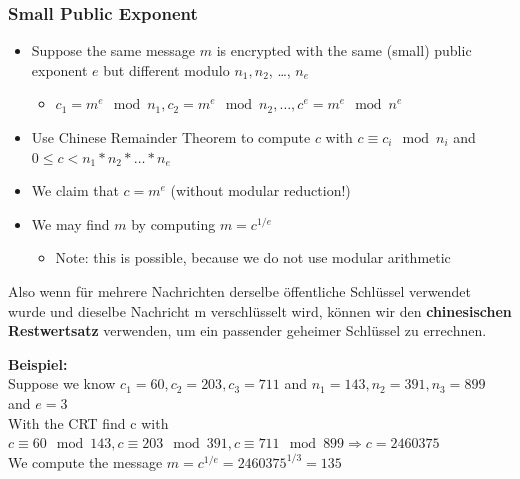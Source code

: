 \hypertarget{small-public-exponent}{%
\subsubsection{Small Public Exponent}\label{small-public-exponent}}

\begin{itemize}
\tightlist
\item
  Suppose the same message $m$ is encrypted with the same (small) public exponent $e$ but different modulo $n_1, n_2$, \ldots{}, $n_e$
  \begin{itemize}
  \tightlist
  \item
    $c_1 = m^e \mod n_1, c_2 = m^e \mod n_2, \ldots{}, c^e = m^e \mod n^e$
  \end{itemize}
\item
  Use Chinese Remainder Theorem to compute $c$ with $c \equiv c_i \mod n_i$ and $0 \leqslant c < n_1 * n_2 * \ldots{} *n_e$
\item
  We claim that $c = m^e$ (without modular reduction!)
\item
  We may find $m$ by computing $m = c^{1/e}$

  \begin{itemize}
  \tightlist
  \item
    Note: this is possible, because we do not use modular arithmetic
  \end{itemize}
\end{itemize}

Also wenn für mehrere Nachrichten derselbe öffentliche Schlüssel verwendet wurde und dieselbe Nachricht m verschlüsselt wird, können wir den \textbf{chinesischen Restwertsatz} verwenden, um ein passender geheimer Schlüssel zu errechnen.

\begin{tcolorbox}[colback=red!5!white,colframe=red!75!black]
\textbf{Beispiel:} \\
Suppose we know $c_1 = 60, c_2 = 203, c_3 = 711$ and $n_1 = 143, n_2 = 391, n_3 = 899$ and $e = 3$ \\
With the CRT find c with $c \equiv 60 \mod 143, c \equiv 203 \mod 391, c\equiv 711 \mod 899 \Rightarrow c = 2460375$ \\
We compute the message $m = c^{1/e} = 2460375^{1/3} = 135$
\end{tcolorbox}

\clearpage